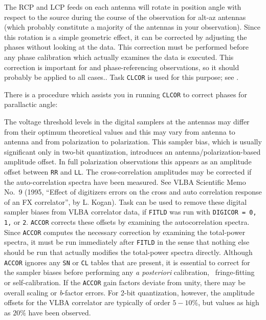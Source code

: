 The RCP and LCP feeds on each antenna will rotate in position angle
with respect to the source during the course of the observation for
alt-az antennas (which probably constitute a majority of the antennas
in your observation).  Since this rotation is a simple geometric
effect, it can be corrected by adjusting the phases without looking at
the data.  This correction must be performed before any phase
calibration which actually examines the data is executed.  This
correction is important for  and phase-referencing
observations, so it should probably be applied to all cases..  Task
{\tt CLCOR} is used for this purpose; see .

There is a procedure which assists you in running {\tt CLCOR} to
correct phases for parallactic angle:

\vfill\eject
{}

The voltage threshold levels in the digital samplers at the antennas
may differ from their optimum theoretical values and this may vary
from antenna to antenna and from polarization to polarization.  This
sampler bias, which is usually significant only in two-bit
quantization, introduces an antenna/polarization-based amplitude
offset.  In full polarization observations this appears as an
amplitude offset between {\tt RR} and {\tt LL}\@.  The
cross-correlation amplitudes may be corrected if the auto-correlation
spectra have been measured.  See VLBA Scientific Memo No.~9 (1995,
``Effect of digitizers errors on the cross and auto correlation
response of an FX correlator'', by L. Kogan).  Task {\tt {}}
can be used to remove these digital sampler biases from VLBA
correlator data, if {\tt FITLD} was run with {\tt DIGICOR = 0, 1,} or
{\tt 2}.   {\tt ACCOR} corrects these offsets by examining the
autocorrelation spectra. Since {\tt ACCOR} computes the necessary correction
by examining the total-power spectra, it must be run immediately after
{\tt FITLD} in the sense that nothing else should be run that actually
modifies the total-power spectra directly.  Although {\tt ACCOR}
ignores any {\tt SN} or {\tt CL} tables that are present, it is
essential to correct for the sampler biases before performing any {\it
a posteriori\/} calibration, \eg\ fringe-fitting or self-calibration.
If the {\tt ACCOR} gain factors deviate from unity, there may be overall
scaling or {\it b\/}-factor errors.  For 2-bit quantization, however,
the amplitude offsets for the VLBA correlator are typically of order
$5-10\%$, but values as high as $20\%$ have been observed.

